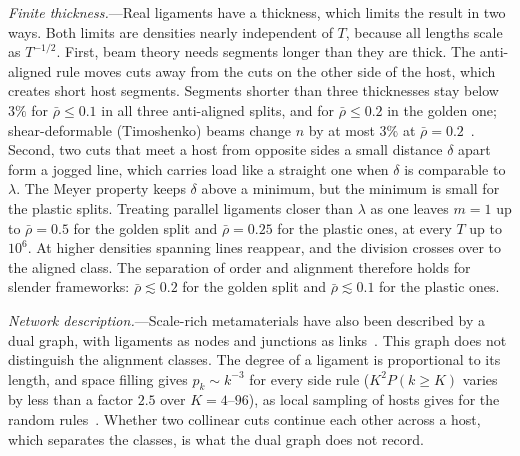 \documentclass[aps,prl,twocolumn,superscriptaddress,amsmath,amssymb,floatfix]{revtex4-2}
\begin{document}
\textit{Finite thickness.}---Real ligaments have a thickness, which limits the result in two
ways. Both limits are densities nearly independent of $T$, because all lengths scale as
$T^{-1/2}$.
First, beam theory needs segments longer than they are thick. The anti-aligned rule moves cuts
away from the cuts on the other side of the host, which creates short host segments. Segments
shorter than three thicknesses stay below $3\%$ for $\bar\rho\le0.1$ in all three
anti-aligned splits, and for $\bar\rho\le0.2$ in the golden one; shear-deformable (Timoshenko)
beams change $n$ by at most $3\%$ at $\bar\rho=0.2$~\cite{supp}. Second, two cuts that meet a
host from opposite sides a small distance $\delta$ apart form a jogged line, which carries load
like a straight one when $\delta$ is comparable to $\lambda$. The Meyer property keeps $\delta$
above a minimum, but the minimum is small for the plastic splits. Treating parallel ligaments
closer than $\lambda$ as one leaves $m=1$ up to $\bar\rho=0.5$ for the golden split and
$\bar\rho=0.25$ for the plastic ones, at every $T$ up to $10^{6}$. At higher densities
spanning lines reappear, and the division crosses over to the aligned class. The separation of
order and alignment therefore holds for slender frameworks: $\bar\rho\lesssim0.2$ for the
golden split and $\bar\rho\lesssim0.1$ for the plastic ones.

\textit{Network description.}---Scale-rich metamaterials have also been described by a dual
graph, with ligaments as nodes and junctions as links~\cite{vazquez2026sr}. This graph does not
distinguish the alignment classes. The degree of a ligament is proportional to its length, and
space filling gives $p_k\sim k^{-3}$ for every side rule ($K^{2}P(k\ge K)$ varies by less than a
factor $2.5$ over $K=4$--$96$), as local sampling of hosts gives for the random
rules~\cite{vazquez2026div}. Whether two collinear cuts continue each other across a host, which
separates the classes, is what the dual graph does not record.
\end{document}
